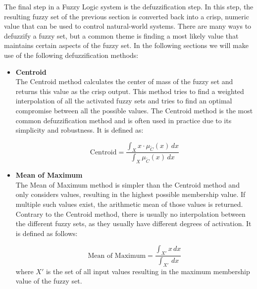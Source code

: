 The final step in a Fuzzy Logic system is the defuzzification step. In this step, the resulting fuzzy set of the previous section is converted back into a crisp, numeric value that can be used to control natural-world systems. There are many ways to defuzzify a fuzzy set, but a common theme is finding a most likely value that maintains certain aspects of the fuzzy set. In the following sections we will make use of the following defuzzification methods:

\begin{itemize}
      \item \textbf{Centroid} \\
            The Centroid method calculates the center of mass of the fuzzy set and returns this value as the crisp output. This method tries to find a weighted interpolation of all the activated fuzzy sets and tries to find an optimal compromise between all the possible values. The Centroid method is the most common defuzzification method and is often used in practice due to its simplicity and robustness. It is defined as:

            \begin{equation}
                  \text{Centroid} = \frac{\int_X x \cdot \mu_{\tilde{C}}(x) \, dx}{\int_X \mu_{\tilde{C}}(x) \, dx}
            \end{equation}

      \item \textbf{Mean of Maximum} \\
            The Mean of Maximum method is simpler than the Centroid method and only considers values, resulting in the highest possible membership value. If multiple such values exist, the arithmetic mean of those values is returned. Contrary to the Centroid method, there is usually no interpolation between the different fuzzy sets, as they usually have different degrees of activation. It is defined as follows:

            \begin{equation}
                  \text{Mean of Maximum} = \frac{\int_{X'} x \, dx}{\int_{X'}  \, dx}
            \end{equation}
            where $X'$ is the set of all input values resulting in the maximum membership value of the fuzzy set.
\end{itemize}
